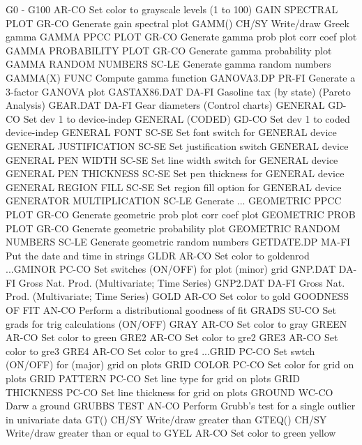 G0 - G100                   AR-CO Set color to grayscale levels (1 to 100)
GAIN SPECTRAL PLOT          GR-CO Generate gain spectral plot
GAMM()                      CH/SY Write/draw Greek gamma
GAMMA PPCC PLOT             GR-CO Generate gamma prob plot corr coef plot
GAMMA PROBABILITY PLOT      GR-CO Generate gamma probability plot
GAMMA RANDOM NUMBERS        SC-LE Generate gamma random numbers
GAMMA(X)                    FUNC  Compute gamma function
GANOVA3.DP                  PR-FI Generate a 3-factor GANOVA plot
GASTAX86.DAT                DA-FI Gasoline tax (by state) (Pareto Analysis)
GEAR.DAT                    DA-FI Gear diameters (Control charts)
GENERAL                     GD-CO Set dev 1 to device-indep
GENERAL (CODED)             GD-CO Set dev 1 to coded device-indep
GENERAL FONT                SC-SE Set font switch for GENERAL device
GENERAL JUSTIFICATION       SC-SE Set justification switch GENERAL device
GENERAL PEN WIDTH           SC-SE Set line width switch for GENERAL device
GENERAL PEN THICKNESS       SC-SE Set pen thickness for GENERAL device
GENERAL REGION FILL         SC-SE Set region fill option for GENERAL device
GENERATOR MULTIPLICATION    SC-LE Generate ...
GEOMETRIC PPCC PLOT         GR-CO Generate geometric prob plot corr coef plot
GEOMETRIC PROB PLOT         GR-CO Generate geometric probability plot
GEOMETRIC RANDOM NUMBERS    SC-LE Generate geometric random numbers
GETDATE.DP                  MA-FI Put the date and time in strings
GLDR                        AR-CO Set color to goldenrod
...GMINOR                   PC-CO Set switches (ON/OFF) for plot (minor) grid
GNP.DAT                     DA-FI Gross Nat. Prod. (Multivariate; Time Series)
GNP2.DAT                    DA-FI Gross Nat. Prod. (Multivariate; Time Series)
GOLD                        AR-CO Set color to gold
GOODNESS OF FIT             AN-CO Perform a distributional goodness of fit
GRADS                       SU-CO Set grads for trig calculations (ON/OFF)
GRAY                        AR-CO Set color to gray
GREEN                       AR-CO Set color to green
GRE2                        AR-CO Set color to gre2
GRE3                        AR-CO Set color to gre3
GRE4                        AR-CO Set color to gre4
...GRID                     PC-CO Set swtch (ON/OFF) for (major) grid on plots
GRID COLOR                  PC-CO Set color for grid on plots
GRID PATTERN                PC-CO Set line type for grid on plots
GRID THICKNESS              PC-CO Set line thickness for grid on plots
GROUND                      WC-CO Darw a ground
GRUBBS TEST                 AN-CO Perform Grubb's test for a single outlier in univariate data
GT()                        CH/SY Write/draw greater than
GTEQ()                      CH/SY Write/draw greater than or equal to
GYEL                        AR-CO Set color to green yellow


